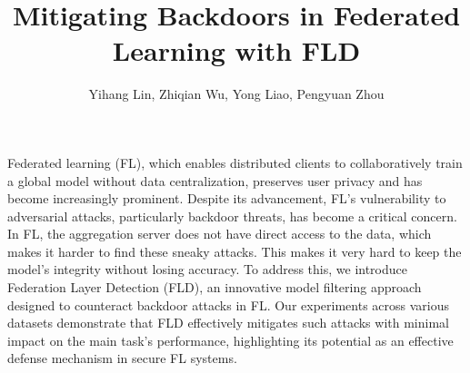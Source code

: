 \documentclass[journal]{IEEEtai}
\begin{document}
\title{Mitigating Backdoors in Federated Learning with FLD} 


\author{Yihang Lin, Zhiqian Wu, Yong Liao, Pengyuan Zhou}


\maketitle



\begin{IEEEImpStatement}
Federated learning (FL), which enables distributed clients to collaboratively train a global model without data centralization, preserves user privacy and has become increasingly prominent. Despite its advancement, FL's vulnerability to adversarial attacks, particularly backdoor threats, has become a critical concern. In FL, the aggregation server does not have direct access to the data, which makes it harder to find these sneaky attacks. This makes it very hard to keep the model's integrity without losing accuracy. To address this, we introduce Federation Layer Detection (FLD), an innovative model filtering approach designed to counteract backdoor attacks in FL. Our experiments across various datasets demonstrate that FLD effectively mitigates such attacks with minimal impact on the main task's performance, highlighting its potential as an effective defense mechanism in secure FL systems.
\end{IEEEImpStatement}
\end{document}

